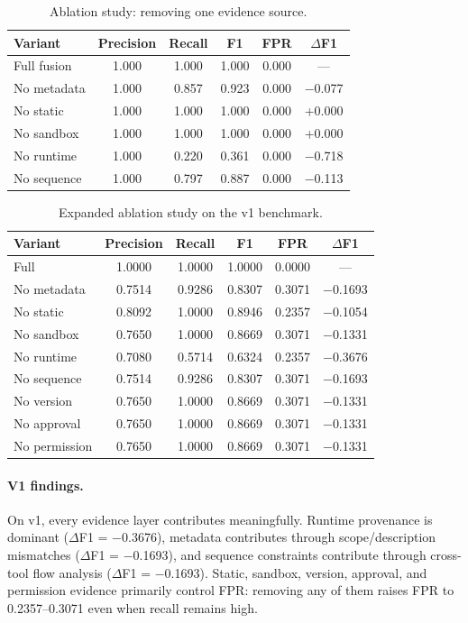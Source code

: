 \documentclass[10pt]{article}
\begin{document}
\begin{table}[t]
\centering
\caption{Ablation study: removing one evidence source.}
\label{tab:ablation}
\begin{tabular}{lccccc}
\toprule
Variant & Precision & Recall & F1 & FPR & $\Delta$F1 \\
\midrule
Full fusion & 1.000 & 1.000 & 1.000 & 0.000 & --- \\
No metadata & 1.000 & 0.857 & 0.923 & 0.000 & $-$0.077 \\
No static & 1.000 & 1.000 & 1.000 & 0.000 & +0.000 \\
No sandbox & 1.000 & 1.000 & 1.000 & 0.000 & +0.000 \\
No runtime & 1.000 & 0.220 & 0.361 & 0.000 & $-$0.718 \\
No sequence & 1.000 & 0.797 & 0.887 & 0.000 & $-$0.113 \\
\bottomrule
\end{tabular}
\end{table}


\begin{table}[t]
\centering
\caption{Expanded ablation study on the v1 benchmark.}
\label{tab:ablation_v1}
\begin{tabular}{lccccc}
\toprule
Variant & Precision & Recall & F1 & FPR & $\Delta$F1 \\
\midrule
Full & 1.0000 & 1.0000 & 1.0000 & 0.0000 & --- \\
No metadata & 0.7514 & 0.9286 & 0.8307 & 0.3071 & $-$0.1693 \\
No static & 0.8092 & 1.0000 & 0.8946 & 0.2357 & $-$0.1054 \\
No sandbox & 0.7650 & 1.0000 & 0.8669 & 0.3071 & $-$0.1331 \\
No runtime & 0.7080 & 0.5714 & 0.6324 & 0.2357 & $-$0.3676 \\
No sequence & 0.7514 & 0.9286 & 0.8307 & 0.3071 & $-$0.1693 \\
No version & 0.7650 & 1.0000 & 0.8669 & 0.3071 & $-$0.1331 \\
No approval & 0.7650 & 1.0000 & 0.8669 & 0.3071 & $-$0.1331 \\
No permission & 0.7650 & 1.0000 & 0.8669 & 0.3071 & $-$0.1331 \\
\bottomrule
\end{tabular}
\end{table}

\paragraph{V1 findings.}
On v1, every evidence layer contributes meaningfully. Runtime provenance is
dominant ($\Delta$F1 = $-$0.3676), metadata contributes through
scope/description mismatches ($\Delta$F1 = $-$0.1693), and sequence constraints
contribute through cross-tool flow analysis ($\Delta$F1 = $-$0.1693). Static,
sandbox, version, approval, and permission evidence primarily control FPR:
removing any of them raises FPR to 0.2357--0.3071 even when recall remains
high.
\end{document}
